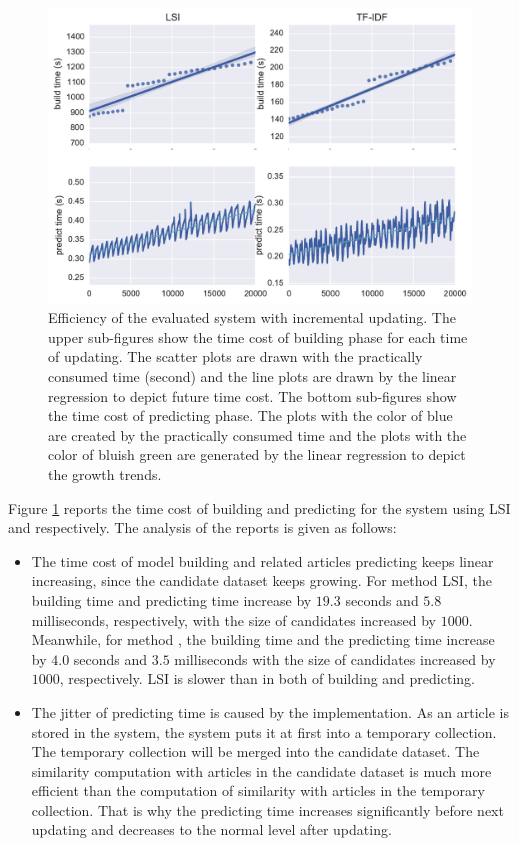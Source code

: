 \begin{figure}[!htb]
    \centering
    \includegraphics[width=\textwidth]{fig/runtime_inc}
    \caption[Efficiency of the evaluated system with incremental updating]{Efficiency of the evaluated system with incremental updating. The upper sub-figures show the time cost of building phase for each time of updating. The scatter plots are drawn with the practically consumed time (second) and the line plots are drawn by the linear regression to depict future time cost. The bottom sub-figures show the time cost of predicting phase. The plots with the color of blue are created by the practically consumed time and the plots with the color of bluish green are generated by the linear regression to depict the growth trends. }
    \label{fig:runtime_inc}
\end{figure}

Figure \ref{fig:runtime_inc} reports the time cost of building and predicting for the system using LSI and \tfidf{} respectively. The analysis of the reports is given as follows:

\begin{itemize}
    \item The time cost of model building and related articles predicting keeps linear increasing, since the candidate dataset keeps growing. For method LSI, the building time and predicting time increase by $19.3$ seconds and $5.8$ milliseconds, respectively, with the size of candidates increased by $1000$. Meanwhile, for method \tfidf{}, the building time and the predicting time increase by $4.0$ seconds and $3.5$ milliseconds with the size of candidates increased by $1000$, respectively. LSI is slower than \tfidf{} in both of building and predicting. 
    \item The jitter of predicting time is caused by the implementation. As an article is stored in the system, the system puts it at first into a temporary collection. The temporary collection will be merged into the candidate dataset. The similarity computation with articles in the candidate dataset is much more efficient than the computation of similarity with articles in the temporary collection. That is why the predicting time increases significantly before next updating and decreases to the normal level after updating. 
    
\end{itemize}

